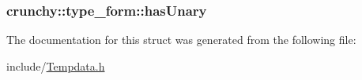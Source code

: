 \subsubsection[{has\+Unary}]{ crunchy\+::type\+\_\+form\+::has\+Unary}\label{structcrunchy_1_1type__form_a78a0fdae7e17412ea3a5374fa7d0925c}


The documentation for this struct was generated from the following file\+:\begin{DoxyCompactItemize}
\item 
include/\hyperlink{_tempdata_8h}{Tempdata.\+h}\end{DoxyCompactItemize}
